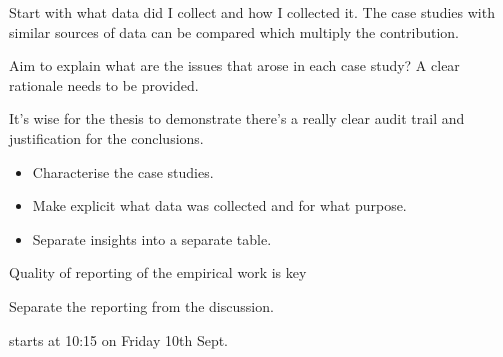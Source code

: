 Start with what data did I collect and how I collected it. The case studies with similar sources of data can be compared which multiply the contribution.

Aim to explain what are the issues that arose in each case study?
A clear rationale needs to be provided. 

It's wise for the thesis to demonstrate there's a really clear audit trail and justification for the conclusions.

\begin{itemize}
    \item Characterise the case studies.
    \item Make explicit what data was collected and for what purpose. 
    \item Separate insights into a separate table. 
\end{itemize}

Quality of reporting of the empirical work is key


Separate the reporting from the discussion.

 starts at 10:15 on Friday 10th Sept.


